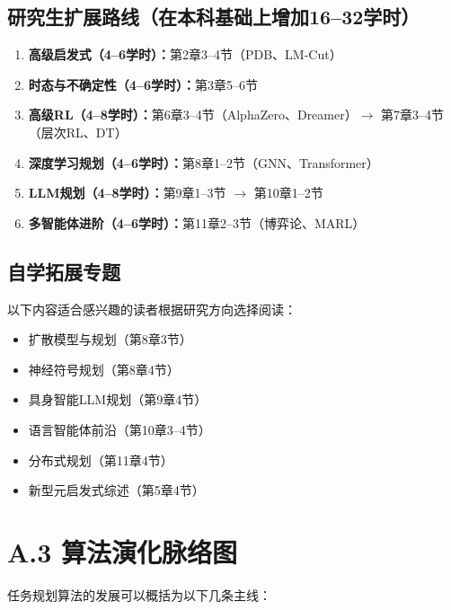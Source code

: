 \subsection*{研究生扩展路线（在本科基础上增加16--32学时）}

\begin{enumerate}
  \item \textbf{高级启发式（4--6学时）：}第2章3--4节（PDB、LM-Cut）
  \item \textbf{时态与不确定性（4--6学时）：}第3章5--6节
  \item \textbf{高级RL（4--8学时）：}第6章3--4节（AlphaZero、Dreamer）$\rightarrow$ 第7章3--4节（层次RL、DT）
  \item \textbf{深度学习规划（4--6学时）：}第8章1--2节（GNN、Transformer）
  \item \textbf{LLM规划（4--8学时）：}第9章1--3节 $\rightarrow$ 第10章1--2节
  \item \textbf{多智能体进阶（4--6学时）：}第11章2--3节（博弈论、MARL）
\end{enumerate}

\subsection*{自学拓展专题}

以下内容适合感兴趣的读者根据研究方向选择阅读：
\begin{itemize}
  \item 扩散模型与规划（第8章3节）
  \item 神经符号规划（第8章4节）
  \item 具身智能LLM规划（第9章4节）
  \item 语言智能体前沿（第10章3--4节）
  \item 分布式规划（第11章4节）
  \item 新型元启发式综述（第5章4节）
\end{itemize}

\section*{A.3 算法演化脉络图}

任务规划算法的发展可以概括为以下几条主线：

